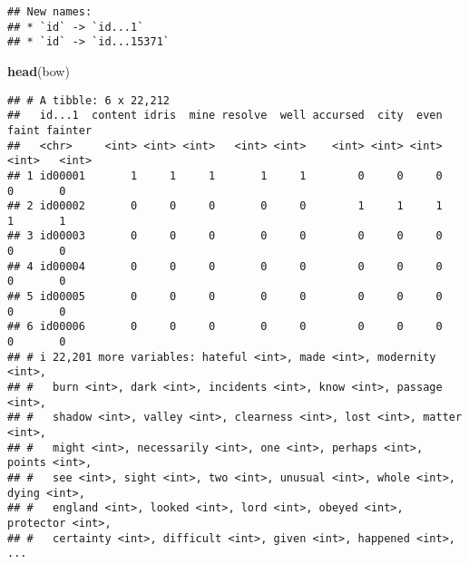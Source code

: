 \documentclass[
]{article}
\newenvironment{Shaded}{\begin{snugshade}}{\end{snugshade}}
\newcommand{\AttributeTok}[1]{\textcolor[rgb]{0.13,0.29,0.53}{#1}}
\newcommand{\CommentTok}[1]{\textcolor[rgb]{0.56,0.35,0.01}{\textit{#1}}}
\newcommand{\DecValTok}[1]{\textcolor[rgb]{0.00,0.00,0.81}{#1}}
\newcommand{\FunctionTok}[1]{\textcolor[rgb]{0.13,0.29,0.53}{\textbf{#1}}}
\newcommand{\NormalTok}[1]{#1}
\newcommand{\OtherTok}[1]{\textcolor[rgb]{0.56,0.35,0.01}{#1}}
\newcommand{\SpecialCharTok}[1]{\textcolor[rgb]{0.81,0.36,0.00}{\textbf{#1}}}
\newcommand{\StringTok}[1]{\textcolor[rgb]{0.31,0.60,0.02}{#1}}
\begin{document}
\begin{Shaded}
\end{Shaded}

\begin{verbatim}
## New names:
## * `id` -> `id...1`
## * `id` -> `id...15371`
\end{verbatim}

\begin{Shaded}
\begin{Highlighting}[]
\FunctionTok{head}\NormalTok{(bow)}
\end{Highlighting}
\end{Shaded}

\begin{verbatim}
## # A tibble: 6 x 22,212
##   id...1  content idris  mine resolve  well accursed  city  even faint fainter
##   <chr>     <int> <int> <int>   <int> <int>    <int> <int> <int> <int>   <int>
## 1 id00001       1     1     1       1     1        0     0     0     0       0
## 2 id00002       0     0     0       0     0        1     1     1     1       1
## 3 id00003       0     0     0       0     0        0     0     0     0       0
## 4 id00004       0     0     0       0     0        0     0     0     0       0
## 5 id00005       0     0     0       0     0        0     0     0     0       0
## 6 id00006       0     0     0       0     0        0     0     0     0       0
## # i 22,201 more variables: hateful <int>, made <int>, modernity <int>,
## #   burn <int>, dark <int>, incidents <int>, know <int>, passage <int>,
## #   shadow <int>, valley <int>, clearness <int>, lost <int>, matter <int>,
## #   might <int>, necessarily <int>, one <int>, perhaps <int>, points <int>,
## #   see <int>, sight <int>, two <int>, unusual <int>, whole <int>, dying <int>,
## #   england <int>, looked <int>, lord <int>, obeyed <int>, protector <int>,
## #   certainty <int>, difficult <int>, given <int>, happened <int>, ...
\end{verbatim}
\end{document}
